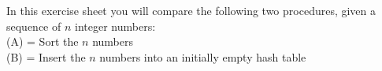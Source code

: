 In this exercise sheet you will compare the following two procedures, given a sequence of $n$ integer numbers:\\
(A) = Sort the $n$ numbers\\
(B) = Insert the $n$ numbers into an initially empty hash table
